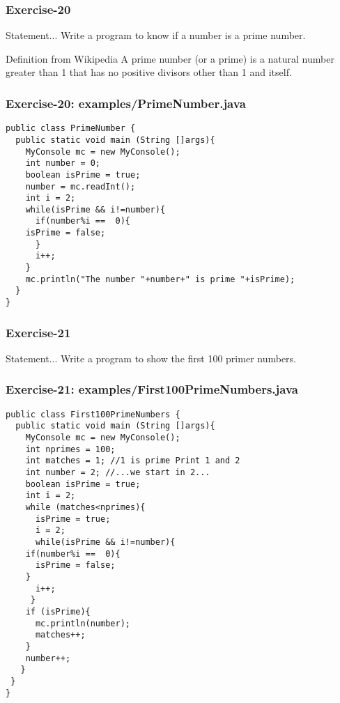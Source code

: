 \documentclass[xcolor=dvipsnames,dvip,notes=show,handout,table]{beamer}
\begin{document}
\begin{frame}[fragile]
\frametitle{Exercise-20}
\begin{block}{Statement...}
Write a program to know if a number is a prime number.
\end{block}

\begin{exampleblock}{Definition from Wikipedia}
 A prime number (or a prime) is a natural number greater than 1 that has no positive divisors other than 1 and itself. 
\end{exampleblock}

\end{frame}


\begin{frame}[fragile]
\frametitle{Exercise-20: examples/PrimeNumber.java}
\scriptsize
\begin{lstlisting}
public class PrimeNumber {
  public static void main (String []args){
    MyConsole mc = new MyConsole();
    int number = 0;
    boolean isPrime = true;
    number = mc.readInt();
    int i = 2;
    while(isPrime && i!=number){
      if(number%i ==  0){
	isPrime = false;
      }
      i++;
    }
    mc.println("The number "+number+" is prime "+isPrime);
  }
}
\end{lstlisting}
\end{frame}




\begin{frame}[fragile]
\frametitle{Exercise-21}
\begin{block}{Statement...}
Write a program to show the first 100 primer numbers.
\end{block}

\end{frame}


\begin{frame}[fragile]
\frametitle{Exercise-21: examples/First100PrimeNumbers.java}
\tiny
\begin{lstlisting}
public class First100PrimeNumbers {
  public static void main (String []args){
    MyConsole mc = new MyConsole();
    int nprimes = 100;
    int matches = 1; //1 is prime Print 1 and 2
    int number = 2; //...we start in 2...
    boolean isPrime = true;			
    int i = 2;
    while (matches<nprimes){
      isPrime = true;
      i = 2;
      while(isPrime && i!=number){
	if(number%i ==  0){
	  isPrime = false;
	}
      i++;
     }
    if (isPrime){
      mc.println(number);
      matches++;
    }
    number++;
   }
 }
}
\end{lstlisting}
\end{frame}
\end{document}
